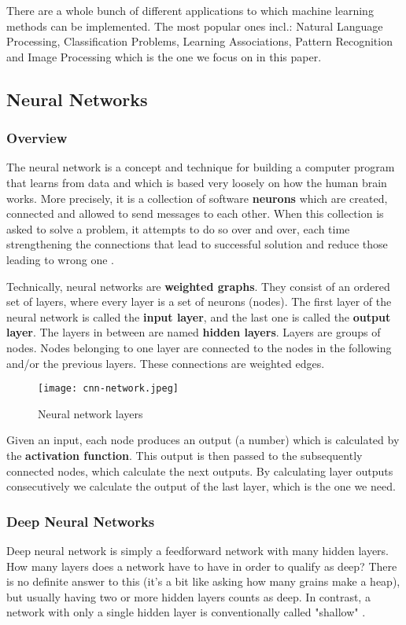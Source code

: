 \documentclass[../Main.tex]{subfiles}
\begin{document}
    There are a whole bunch of different applications to which machine learning methods can be implemented. The most popular ones \cite{MLgoogle} incl.: Natural Language Processing, Classification Problems, Learning Associations, Pattern Recognition and Image Processing which is the one we focus on in this paper.


\subsection{Neural Networks}
    \subsubsection{Overview}
    The neural network is a concept and technique for building a computer program that learns from data and which is based very loosely on how the human brain works. More precisely, it is a collection of software \textbf{neurons} which are created, connected and allowed to send messages to each other. When this collection is asked to solve a problem, it attempts to do so over and over, each time strengthening the connections that lead to successful solution and reduce those leading to wrong one \cite{tfplayground}.
    
     Technically, neural networks are \textbf{weighted graphs}. They consist of an ordered set of layers, where every layer is a set of neurons (nodes). The first layer of the neural network is called the \textbf{input layer}, and the last one is called the \textbf{output layer}. The layers in between are named \textbf{hidden layers}. Layers are groups of nodes. Nodes belonging to one layer are connected to the nodes in the following and/or the previous layers. These connections are weighted edges. \\ 
    \begin{figure}[h!]
        \centering
        \texttt{[image: cnn-network.jpeg]}
        \caption{Neural network layers}
        \label{fig:nn-scheme}
    \end{figure}

    Given an input, each node produces an output (a number) which is calculated by the \textbf{activation function}. This output is then passed to the subsequently connected nodes, which calculate the next outputs. By calculating layer outputs consecutively we calculate the output of the last layer, which is the one we need.
    
    \subsubsection{Deep Neural Networks}
    Deep neural network is simply a feedforward network with many hidden layers. 
    How many layers does a network have to have in order to qualify as deep? There is no definite answer to this (it's a bit like asking how many grains make a heap), but usually having two or more hidden layers counts as deep. In contrast, a network with only a single hidden layer is conventionally called "shallow" \cite{Goodfellow-et-al-2016}.
    
\end{document}
